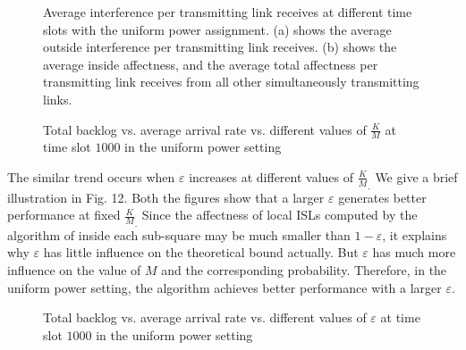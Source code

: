 \documentclass[journal]{IEEEtran}
\begin{document}
\begin{figure}
\centering
  \hspace{0cm}
  \hfill
     \caption{{\small{Average interference per transmitting link receives at different time slots with the uniform power assignment. (a) shows the average outside interference  per transmitting link receives. (b) shows the average inside affectness, and the average total affectness per transmitting link receives from all other simultaneously transmitting links.} }}
\end{figure}

\begin{figure*}[htpb]
    \centering
  \hspace{0cm}
  \hspace{0cm}
   \caption{{\small{Total backlog vs. average arrival rate  vs. different values of $\frac{K}{M}$  at time slot $1000$ in the uniform power setting}}}
\end{figure*}

The similar trend occurs when $\varepsilon$ increases at different values of $\frac{K}{M}_.$ We give a brief illustration in Fig. 12. Both the figures show that a larger $\varepsilon$ generates better performance at fixed $\frac{K}{M}_. $
Since the affectness of local ISLs computed by the algorithm of \cite{S:phy9} inside each sub-square may be much smaller than $1-\varepsilon$, it explains why $\varepsilon$ has little influence on the theoretical bound actually. But $\varepsilon$ has much more influence on the value of $M$ and the corresponding probability. Therefore, in the uniform power setting, the algorithm achieves better performance with a larger $\varepsilon$.

\begin{figure}[htpb]
    \centering
  \hspace{0cm}
   \caption{{\small{Total backlog vs. average arrival rate vs. different values of $\varepsilon$ at time slot $1000$ in the uniform power setting}}}
\end{figure}
\end{document}
